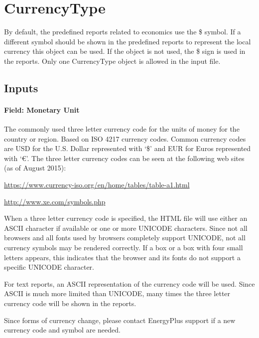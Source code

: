 \section{CurrencyType}\label{currencytype}
By default, the predefined reports related to economics use the \$ symbol. If a different symbol should be shown in the predefined reports to represent the local currency this object can be used. If the object is not used, the \$ sign is used in the reports. Only one CurrencyType object is allowed in the input file.

\subsection{Inputs}

\paragraph{Field: Monetary Unit}\label{field-monetary-unit}

The commonly used three letter currency code for the units of money for the country or region. Based on ISO 4217 currency codes. Common currency codes are USD for the U.S. Dollar represented with `\$' and EUR for Euros represented with `€'. The three letter currency codes can be seen at the following web sites (as of August 2015):

\url{https://www.currency-iso.org/en/home/tables/table-a1.html}

\url{http://www.xe.com/symbols.php}

When a three letter currency code is specified, the HTML file will use either an ASCII character if available or one or more UNICODE characters. Since not all browsers and all fonts used by browsers completely support UNICODE, not all currency symbols may be rendered correctly. If a box or a box with four small letters appears, this indicates that the browser and its fonts do not support a specific UNICODE character.

For text reports, an ASCII representation of the currency code will be used. Since ASCII is much more limited than UNICODE, many times the three letter currency code will be shown in the reports.

Since forms of currency change, please contact EnergyPlus support if a new currency code and symbol are needed.
